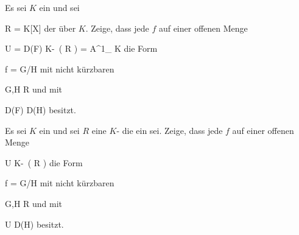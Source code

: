 \setcounter{section}{14}







{}
{





Es sei $K$ ein
und sei

\mavergleichskette
{\vergleichskette
{R
}
{ = }{ K[X]
}
{  }{
}
{    }{
}
{   }{
}
}
{}{}{}
der
über $K$. Zeige, dass jede
$f$ auf einer offenen Menge

\mavergleichskettedisp
{\vergleichskette
{U
}
{ =} { D(F)
}
{ \subseteq} { K\!-\!\, \left(   R   \right)
}
{ =} { {\mathbb A}^{1}_{ K }
}
{ } {
}
}
{}{}{}
die Form

\mavergleichskette
{\vergleichskette
{f
}
{ = }{ G/H
}
{  }{
}
{    }{
}
{   }{
}
}
{}{}{}
mit nicht kürzbaren

\mavergleichskette
{\vergleichskette
{ G,H
}
{ \in }{ R
}
{  }{
}
{    }{
}
{   }{
}
}
{}{}{}
und mit

\mavergleichskette
{\vergleichskette
{ D(F)
}
{ \subseteq }{ D(H)
}
{  }{
}
{    }{
}
{   }{
}
}
{}{}{}
besitzt.





}
{} {}

{}
{





Es sei $K$ ein
und sei $R$ eine
$K$-
die ein
sei. Zeige, dass jede
$f$ auf einer offenen Menge

\mavergleichskettedisp
{\vergleichskette
{U
}
{ \subseteq} { K\!-\!\, \left(   R   \right)
}
{ } {
}
{ } {
}
{ } {
}
}
{}{}{}
die Form

\mavergleichskette
{\vergleichskette
{f
}
{ = }{ G/H
}
{  }{
}
{    }{
}
{   }{
}
}
{}{}{}
mit nicht kürzbaren

\mavergleichskette
{\vergleichskette
{ G,H
}
{ \in }{ R
}
{  }{
}
{    }{
}
{   }{
}
}
{}{}{}
und mit

\mavergleichskette
{\vergleichskette
{ U
}
{ \subseteq }{ D(H)
}
{  }{
}
{    }{
}
{   }{
}
}
{}{}{}
besitzt.





}
{} {}

